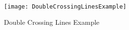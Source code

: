 
\begin{figure}[htbp]
	\centering
	\texttt{[image: DoubleCrossingLinesExample]}
	\caption{Double Crossing Lines Example}
	\label{fig:doubleCrossingLinesExample}
\end{figure}

						
